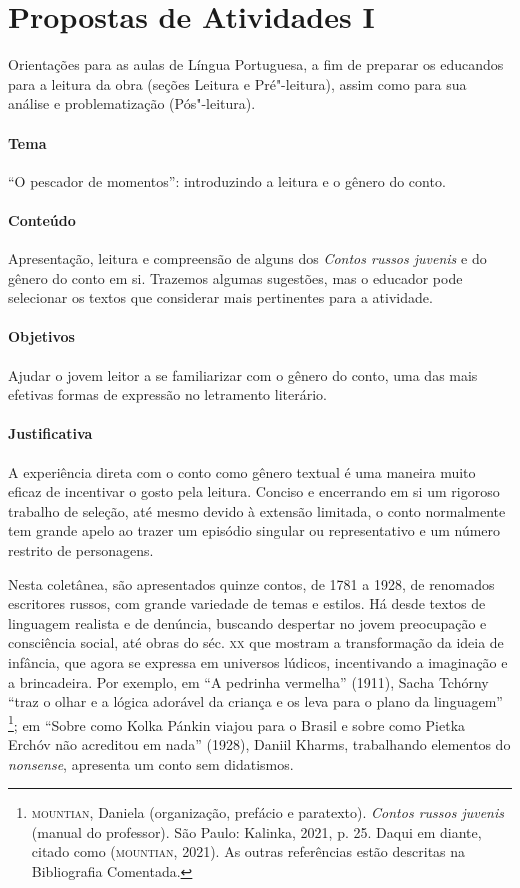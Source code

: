 \documentclass[11pt]{extarticle}
\begin{document}
\section{Propostas de Atividades I}

Orientações para as aulas de Língua Portuguesa, a fim de preparar
os educandos para a leitura da obra (seções Leitura e Pré"-leitura), assim como para
sua análise e problematização (Pós"-leitura).

\paragraph{Tema} ``O pescador de momentos'': introduzindo a leitura e o gênero do conto.

\paragraph{Conteúdo}
Apresentação, leitura e compreensão de alguns dos \emph{Contos russos
juvenis} e do gênero do conto em si. Trazemos algumas sugestões, mas o
educador pode selecionar os textos que considerar mais pertinentes para
a atividade.

\paragraph{Objetivos}
Ajudar o jovem leitor a se familiarizar com o gênero do conto, uma das
mais efetivas formas de expressão no letramento literário.

\paragraph{Justificativa}
A experiência direta com o conto como gênero textual é uma maneira muito
eficaz de incentivar o gosto pela leitura. Conciso e encerrando em si um
rigoroso trabalho de seleção, até mesmo devido à extensão limitada, o
conto normalmente tem grande apelo ao trazer um episódio singular ou
representativo e um número restrito de personagens.

Nesta coletânea, são apresentados quinze contos, de 1781 a 1928, de
renomados escritores russos, com grande variedade de temas e estilos. Há
desde textos de linguagem realista e de denúncia, buscando despertar no
jovem preocupação e consciência social, até obras do séc. \textsc{xx} que mostram
a transformação da ideia de infância, que agora se expressa em universos
lúdicos, incentivando a imaginação e a brincadeira. Por exemplo, em ``A
pedrinha vermelha'' (1911), Sacha Tchórny ``traz o olhar e a
lógica adorável da criança e os leva para o plano da linguagem''
\footnote{\textsc{mountian}, Daniela (organização, prefácio e paratexto). \emph{Contos russos juvenis} (manual do professor). São Paulo: Kalinka, 2021, p. 25. Daqui em diante, citado como (\textsc{mountian}, 2021). As outras referências estão descritas na Bibliografia Comentada.}; em ``Sobre como Kolka Pánkin viajou para o
Brasil e sobre como Pietka Erchóv não acreditou em nada'' (1928), Daniil
Kharms, trabalhando elementos do \emph{nonsense}, apresenta um conto sem didatismos.
\end{document}
